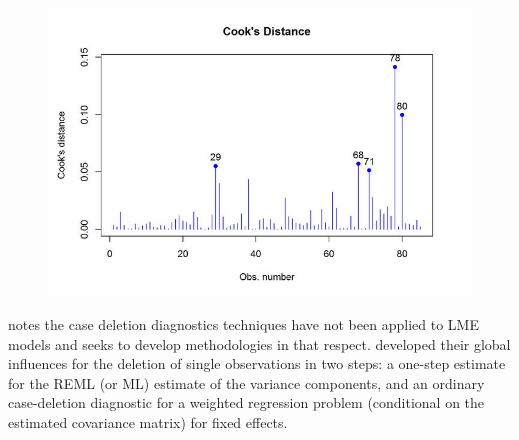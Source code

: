 \documentclass[12pt, a4paper]{report}
\theoremstyle{definition}
\theoremstyle{remark}
\begin{document}
%




\begin{figure}[h!]
\centering
\includegraphics[width=0.9\linewidth]{images/CooksDistancePlot-JS-Roy}
\caption{}
\label{fig:CooksDistancePlot-JS-Roy}
\end{figure}
%


\citet{Christensen} notes the case deletion diagnostics techniques have not been applied to LME models and seeks to develop methodologies in that respect. \citet{Christensen} developed their global influences for the deletion of single observations in two steps: a one-step estimate for the REML (or ML) estimate of the variance components, and an ordinary case-deletion diagnostic for a weighted regression problem (conditional on the estimated covariance matrix) for fixed effects.
\end{document}
